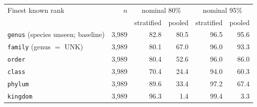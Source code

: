 \begin{tabular}{lrrrrr}
\toprule
Finest known rank & $n$ & \multicolumn{2}{c}{nominal 80\%} & \multicolumn{2}{c}{nominal 95\%} \\
 & & stratified & pooled & stratified & pooled \\
\midrule
\texttt{genus} (species unseen; baseline) & 3{,}989 & 82.8 & 80.5 & 96.5 & 95.6 \\
\texttt{family} (genus $=$ UNK) & 3{,}989 & 80.1 & 67.0 & 96.0 & 93.3 \\
\texttt{order} & 3{,}989 & 80.4 & 52.6 & 96.0 & 86.0 \\
\texttt{class} & 3{,}989 & 70.4 & 24.4 & 94.0 & 60.3 \\
\texttt{phylum} & 3{,}989 & 89.6 & 33.4 & 97.2 & 67.4 \\
\texttt{kingdom} & 3{,}989 & 96.3 & 1.4 & 99.4 & 3.3 \\
\bottomrule
\end{tabular}
